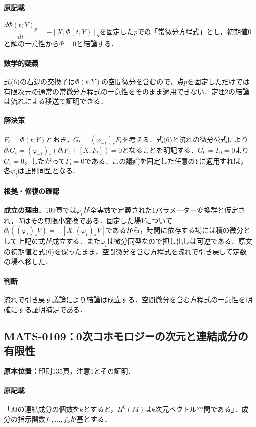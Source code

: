 \documentclass[a4paper,10pt]{ltjsarticle}
\begin{document}
\paragraph{原記載}$\dfrac{d\Phi(t;Y)_p}{dt}=-[X,\Phi(t,Y)]_p$を固定した$p$での「常微分方程式」とし，初期値0と解の一意性から$\Phi=0$と結論する．

\paragraph{数学的疑義}式(6)の右辺の交換子は$\Phi(t;Y)$の空間微分を含むので，点$p$を固定しただけでは有限次元の通常の常微分方程式の一意性をそのまま適用できない．定理2の結論は流れによる移送で証明できる．

\paragraph{解決策}$F_t=\Phi(t;Y)$とおき，$G_t=(\varphi_{-t})_*F_t$を考える．式(6)と流れの微分公式により$\partial_tG_t=(\varphi_{-t})_*(\partial_tF_t+[X,F_t])=0$となることを明記する．$G_0=F_0=0$より$G_t=0$，したがって$F_t=0$である．この議論を固定した任意の$Y$に適用すれば，各$\varphi_t$は正則同型となる．

\paragraph{根拠・修復の確認}\textbf{成立の理由．}109頁では$\varphi_t$が全実数で定義された1パラメーター変換群と仮定され，$X$はその無限小変換である．固定した場$V$について$\partial_t((\varphi_t)_*V)=-[X,(\varphi_t)_*V]$であるから，時間に依存する場には積の微分として上記の式が成立する．また$\varphi_t$は微分同型なので押し出しは可逆である．原文の初期値と式(6)を保ったまま，空間微分を含む方程式を流れで引き戻して定数の場へ移した．

\paragraph{判断}流れで引き戻す議論により結論は成立する．空間微分を含む方程式の一意性を明確にする証明補足である．


\subsection*{MATS-0109：0次コホモロジーの次元と連結成分の有限性}\label{math:MATS-0109}
\noindent\textbf{原本位置：}印刷135頁，注意1とその証明．

\paragraph{原記載}「$M$の連結成分の個数を$k$とすると，$H^0(M)$は$k$次元ベクトル空間である」．成分の指示関数$f_1,\ldots,f_k$が基とする．
\end{document}
